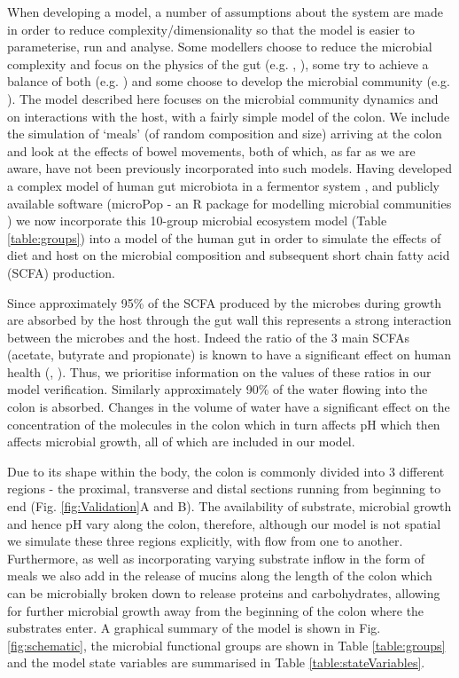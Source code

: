 \documentclass[a4paper]{article}
\begin{document}
When developing a model, a number of assumptions about the system are made in order to reduce complexity/dimensionality so that the model is easier to parameterise, run and analyse. Some modellers choose to reduce the microbial complexity and focus on the physics of the gut (e.g. \cite{Cremer16}, \cite{Cremer17}), some try to achieve a balance of both (e.g. \cite{Munoz}) and some choose to develop the microbial community (e.g. \cite{smith}). The model described here focuses on the microbial community dynamics and on interactions with the host, with a fairly simple model of the colon. We include the simulation of `meals' (of random composition and size) arriving at the colon and look at the effects of bowel movements, both of which, as far as we are aware, have not been previously incorporated into such models.
Having developed a complex model of human gut microbiota in a fermentor system \citep{Kettle2015}, and publicly available software (microPop - an R package for modelling microbial communities \citep{Kettle2018}) we now incorporate this 10-group microbial ecosystem model (Table \ref{table:groups}) into a model of the human gut in order to simulate the effects of diet and host on the microbial composition and subsequent short chain fatty acid (SCFA) production. 

Since approximately 95\% of the SCFA produced by the microbes during growth are absorbed by the host through the gut wall this represents a strong interaction between the microbes and the host. 
Indeed the ratio of the 3 main SCFAs (acetate, butyrate and propionate) is known to have a significant effect on human health (\cite{louis2014}, \cite{morrison2016}).
Thus, we prioritise information on the values of these ratios in our model verification.
Similarly approximately 90\% of the water flowing into the colon is absorbed. Changes in the volume of water have a significant effect on the concentration of the molecules in the colon which in turn affects pH which then affects microbial growth, all of which are included in our model.

Due to its shape within the body, the colon is commonly divided into 3 different regions - the proximal, transverse and distal sections running from beginning to end (Fig. \ref{fig:Validation}A and B). 
The availability of substrate, microbial growth and hence pH vary along the colon, therefore, although our model is not spatial we simulate these three regions explicitly, with flow from one to another.
Furthermore, as well as incorporating varying substrate inflow in the form of meals we also add in the release of mucins along the length of the colon which can be microbially broken down to release proteins and carbohydrates, allowing for further microbial growth away from the beginning of the colon where the substrates enter.
A graphical summary of the model is shown in Fig. \ref{fig:schematic}, the microbial functional groups are shown in Table \ref{table:groups} and the model state variables are summarised in Table \ref{table:stateVariables}.
\end{document}
